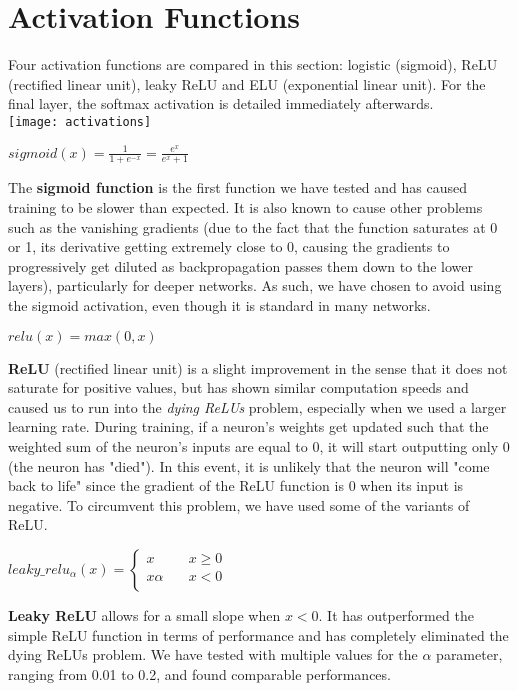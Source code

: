 \section{Activation Functions}
Four activation functions are compared in this section: logistic (sigmoid), ReLU (rectified linear unit), leaky ReLU and ELU (exponential linear unit). For the final layer, the softmax activation is detailed immediately afterwards.\\
\texttt{[image: activations]}
\begin{center}
$sigmoid(x) = \frac{1}{1+e^{-x}} = \frac{e^x}{e^x+1}$\\
\end{center}

The \textbf{sigmoid function}  is the first function we have tested and has caused training to be slower than expected. It is also known to cause other problems such as the vanishing gradients (due to the fact that the function saturates at 0 or 1, its derivative getting extremely close to 0, causing the gradients to progressively get diluted as backpropagation passes them down to the lower layers), particularly for deeper networks. As such, we have chosen to avoid using the sigmoid activation, even though it is standard in many networks.\\

\begin{center}
$relu(x) = max(0,x)$
\end{center}
\textbf{ReLU} (rectified linear unit) is a slight improvement in the sense that it does not saturate for positive values, but has shown similar computation speeds and caused us to run into the \textit{dying ReLUs} problem, especially when we used a larger learning rate. During training, if a neuron's weights get updated such that the weighted sum of the neuron's inputs are equal to 0, it will start outputting only 0 (the neuron has "died"). In this event, it is unlikely that the neuron will "come back to life" since the gradient of the ReLU function is 0 when its input is negative. To circumvent this problem, we have used some of the variants of ReLU.
\begin{center}
$leaky\_relu_\alpha(x)= 
	\begin{cases}
		x &\quad x \geq 0\\
		x\alpha & \quad x < 0\\
	\end{cases}
$
\end{center}
\textbf{Leaky ReLU} allows for a small slope when $x<0$. It has outperformed the simple ReLU function in terms of performance and has completely eliminated the dying ReLUs problem. We have tested with multiple values for the $\alpha$ parameter, ranging from 0.01 to 0.2, and found comparable performances.


